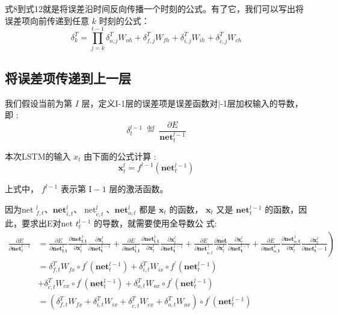\documentclass[10.5pt,compsoc]{CjC}
\theoremstyle{mystyle}
\begin{document}
式8到式12就是将误差沿时间反向传播一个时刻的公式。有了它，我们可以写出将误差项向前传递到任意 $k$ 时刻的公式：
$$
\delta_{k}^{T}=\prod_{j=k}^{t-1} \delta_{o, j}^{T} W_{o h}+\delta_{f, j}^{T} W_{f h}+\delta_{i, j}^{T} W_{i h}+\delta_{\tilde{c}, j}^{T} W_{c h}
$$

{\heiti \subsection{将误差项传递到上一层} }
我们假设当前为第 $I$ 层，定义I-1层的误差项是误差函数对|-1层加权输入的导数，即 :
$$
\delta_{t}^{l-1} \stackrel{\text { def }}{=} \frac{\partial E}{\mathbf{n e t}_{t}^{l-1}}
$$

本次LSTM的输入 $x_{t}$ 由下面的公式计算 :
$$
\mathbf{x}_{t}^{l}=f^{l-1}\left(\mathbf{n e t}_{t}^{l-1}\right)
$$

上式中， $f^{l-1}$ 表示第 $\mathrm{I}-1$ 层的激活函数。

因为net ${ }_{f, t}^{l} 、 \mathbf{n e t}_{i, t}^{l} 、 \operatorname{net}_{\tilde{c}, t}^{l} 、 \mathbf{n e t}_{o, t}^{l}$ 都是 $\mathbf{x}_{t}$ 的函数， $\mathbf{x}_{t}$ 又是 $\mathbf{n e t}_{t}^{l-1}$ 的函数，因此，要求出E对net $t_{t}^{l-1}$ 的导数，就需要使用全导数公 式:
$$
\begin{aligned}
\frac{\partial E}{\partial \mathbf{n e t}_{t}^{l-1}}&\left.=\frac{\partial E}{\partial \mathbf{n e t}_{\mathbf{f}, \mathbf{t}}^{1}} \frac{\partial \mathbf{n e t}_{\mathbf{f}, \mathbf{t}}^{1}}{\partial \mathbf{x}_{t}^{l}} \frac{\partial \mathbf{x}_{t}^{l}}{\partial \mathbf{n e t}_{\mathbf{t}}^{1-1}}+\frac{\partial E}{\partial \mathbf{n e t}_{\mathbf{i}, \mathbf{t}}^{1}} \frac{\partial \mathbf{n e t}_{\mathbf{i}, \mathbf{t}}^{1}}{\partial \mathbf{x}_{t}^{l}} \frac{\partial \mathbf{x}_{t}^{l}}{\partial \mathbf{n e t}_{\mathbf{t}}^{1-1}}+\frac{\partial E}{\partial \mathbf{n e t}_{\tilde{\mathbf{c}, t}}^{1}} \frac{\partial \mathbf{n e t}}{\partial \mathbf{x}_{t}^{l}} \frac{\partial \mathbf{x}_{t}^{l}}{\partial \mathbf{n e t}_{\mathbf{t}}^{l-1}}+\frac{\partial E}{\partial \mathbf{n e t}_{\mathbf{o}, \mathbf{t}}^{1}} \frac{\partial \mathbf{n e t}_{\mathbf{o}, \mathbf{t}}^{1}}{\partial \mathbf{x}_{t}^{l}} \frac{\partial \mathbf{x}_{l}^{l}}{\partial \mathbf{n e t}_{\mathbf{t}}^{1}-1}\right)\\
&=\delta_{f, t}^{T} W_{f x} \circ f^{\prime}\left(\mathbf{n e t}_{t}^{l-1}\right)+\delta_{i, t}^{T} W_{i x} \circ f^{\prime}\left(\mathbf{n e t}_{t}^{l-1}\right)\\
&+\delta_{\tilde{c}, t}^{T} W_{c x} \circ f^{\prime}\left(\mathbf{n e t}_{t}^{l-1}\right)+\delta_{o, t}^{T} W_{o x} \circ f^{\prime}\left(\mathbf{n e t}_{t}^{l-1}\right) \\
&=\left(\delta_{f, t}^{T} W_{f x}+\delta_{i, t}^{T} W_{i x}+\delta_{\tilde{c}, t}^{T} W_{c x}+\delta_{o, t}^{T} W_{o x}\right) \circ f^{\prime}\left(\mathbf{n e t}_{t}^{l-1}\right)
\end{aligned}
$$
\end{document}
